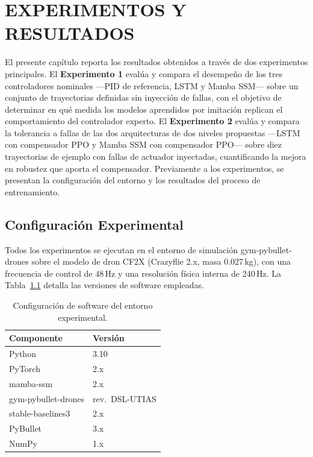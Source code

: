 \chapter{EXPERIMENTOS Y RESULTADOS}

\newcommand{\nd}{\textit{---}}

El presente capítulo reporta los resultados obtenidos a través de dos experimentos principales. El \textbf{Experimento 1} evalúa y compara el desempeño de los tres controladores nominales —PID de referencia, LSTM y Mamba SSM— sobre un conjunto de trayectorias definidas sin inyección de fallas, con el objetivo de determinar en qué medida los modelos aprendidos por imitación replican el comportamiento del controlador experto. El \textbf{Experimento 2} evalúa y compara la tolerancia a fallas de las dos arquitecturas de dos niveles propuestas —LSTM con compensador PPO y Mamba SSM con compensador PPO— sobre diez trayectorias de ejemplo con fallas de actuador inyectadas, cuantificando la mejora en robustez que aporta el compensador. Previamente a los experimentos, se presentan la configuración del entorno y los resultados del proceso de entrenamiento.


\section{Configuración Experimental}

Todos los experimentos se ejecutan en el entorno de simulación gym-pybullet-drones sobre el modelo de dron CF2X (Crazyflie 2.x, masa 0.027\,kg), con una frecuencia de control de 48\,Hz y una resolución física interna de 240\,Hz. La Tabla~\ref{tab:config_sw} detalla las versiones de software empleadas.

\begin{table}[h]
\centering
\caption{Configuración de software del entorno experimental.}
\label{tab:config_sw}
\begin{tabular}{ll}
\hline
\textbf{Componente} & \textbf{Versión} \\
\hline
Python          & 3.10 \\
PyTorch         & 2.x \\
mamba-ssm       & 2.x \\
gym-pybullet-drones & rev.\ DSL-UTIAS \\
stable-baselines3   & 2.x \\
PyBullet        & 3.x \\
NumPy           & 1.x \\
\hline
\end{tabular}
\end{table}

